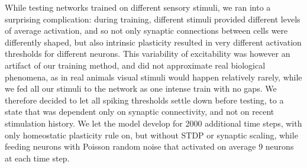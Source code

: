\documentclass{article}
\begin{document}
While testing networks trained on different sensory stimuli, we ran into a surprising complication: during training, different stimuli provided different levels of average activation, and so not only synaptic connections between cells were differently shaped, but also intrinsic plasticity resulted in very different activation thresholds for different neurons. This variability of excitability was however an artifact of our training method, and did not approximate real biological phenomena, as in real animals visual stimuli would happen relatively rarely, while we fed all our stimuli to the network as one intense train with no gaps. We therefore decided to let all spiking thresholds settle down before testing, to a state that was dependent only on synaptic connectivity, and not on recent stimulation history. We let the model develop for 2000 additional time steps, with only homeostatic plasticity rule on, but without STDP or synaptic scaling, while feeding neurons with Poisson random noise that activated on average 9 neurons at each time step. 
\end{document}
